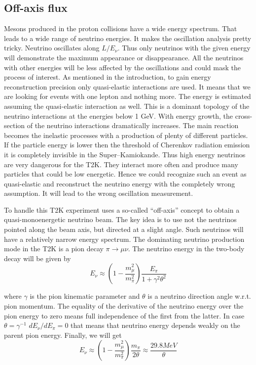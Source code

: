\documentclass[../main.tex]{subfiles}
\begin{document}
\subsection{Off-axis flux}
\label{sec:T2K:oa_flux}
Mesons produced in the proton collisions have a wide energy spectrum. That leads to a wide range of neutrino energies. It makes the oscillation analysis pretty tricky. Neutrino oscillates along $L/E_\nu$. Thus only neutrinos with the given energy will demonstrate the maximum appearance or disappearance. All the neutrinos with other energies will be less affected by the oscillations and could mask the process of interest. As mentioned in the introduction, to gain energy reconstruction precision only quasi-elastic interactions are used. It means that we are looking for events with one lepton and nothing more. The energy is estimated assuming the quasi-elastic interaction as well. This is a dominant topology of the neutrino interactions at the energies below 1 GeV. With energy growth, the cross-section of the neutrino interactions dramatically increases. The main reaction becomes the inelastic processes with a production of plenty of different particles. If the particle energy is lower then the threshold of Cherenkov radiation emission it is completely invisible in the Super--Kamiokande. Thus high energy neutrinos are very dangerous for the T2K. They interact more often and produce many particles that could be low energetic. Hence we could recognize such an event as quasi-elastic and reconstruct the neutrino energy with the completely wrong assumption. It will lead to the wrong oscillation measurement.

To handle this T2K experiment uses a so-called ``off-axis'' concept to obtain a quasi-monoenergetic neutrino beam. The key idea is to use not the neutrinos pointed along the beam axis, but directed at a slight angle. Such neutrinos will have a relatively narrow energy spectrum. The dominating neutrino production mode in the T2K is a pion decay $\pi\to\mu\nu$. The neutrino energy in the two-body decay will be given by
\begin{equation}
E_\nu\approx\left(1-\frac{m_\mu^2}{m_\pi^2}\right)\frac{E_\pi}{1+\gamma^2\theta^2}
\end{equation}

where $\gamma$ is the pion kinematic parameter and $\theta$ is a neutrino direction angle w.r.t. pion momentum. The equality of the derivative of the neutrino energy over the pion energy to zero means full independence of the first from the latter. In case $\theta=\gamma^{-1}$ $dE_\nu/dE_\pi=0$ that means that neutrino energy depends weakly on the parent pion energy. Finally, we will get
\begin{equation}
E_\nu\approx\left(1-\frac{m_\mu^2}{m_\pi^2}\right)\frac{m_\pi}{2\theta}\approx\frac{29.8MeV}{\theta}
\end{equation}
\end{document}
